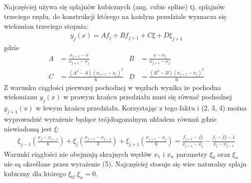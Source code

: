 \documentclass[11pt]{extarticle}
\begin{document}
	\subsection{}
	Najczęściej używa się splajnów kubicznych (ang. cubic spline) tj. splajnów trzeciego rzędu, do konstrukcji którego na każdym przedziale wyznacza się wielomian trzeciego stopnia: 
	\begin{align}
		y_j(x) = A f_j + B f_{j+1} + C \xi + D \xi_{j+1}
	\end{align}
	gdzie
	\begin{align}
		A &= \frac{x_{j+1} - x}{x_{j+1} - x_j} & B &= \frac{x - x_{j}}{x_{j+1} - x_j} \\[0.5cm]
		C &= \frac{(A^3-A)(x_{j+1}-x_j)^2}{6} & D &= \frac{(B^3-B)(x_{j+1}-x_j)^2}{6}
	\end{align}
	Z warunku ciągłości pierwszej pochodnej w węzłach wynika że pochodna wielomianu \(y_j(x)\) w prawym krańcu przedziału musi się równać pochodnej \(y_{j+1}(x)\) w lewym krańcu przedziału. Korzystając z tego faktu i (2, 3, 4) można wyprowadzić wyrażenie będące trójdiagonalnym układem równań gdzie niewiadomą jest \(\xi\):
	\begin{align}
		\xi_{j-1} \left( \frac{x_j - x_{j-1}}{6} \right) + 
		\xi_{j} \left( \frac{x_{j+1} - x_{j-1}}{3} \right) + 
		\xi_{j+1} \left( \frac{x_{j+1} - x_{j}}{6} \right) = 
		\frac{f_{j+1} - f{j}}{x_{j+1} - x_j} - 
		\frac{f_{j} - f{j-1}}{x_j - x_{j-1}}
	\end{align}
	Warunki ciągłości nie obejmują skrajnych węzłów \(x_1\) i \(x_n\) parametry \(\xi_0\) oraz \(\xi_n\) nie są określane przez wyrażenie (5). Najczęściej stosuje się wiec naturalny splajn kubiczny dla którego \(\xi_0, \xi_n = 0\).
\end{document}
